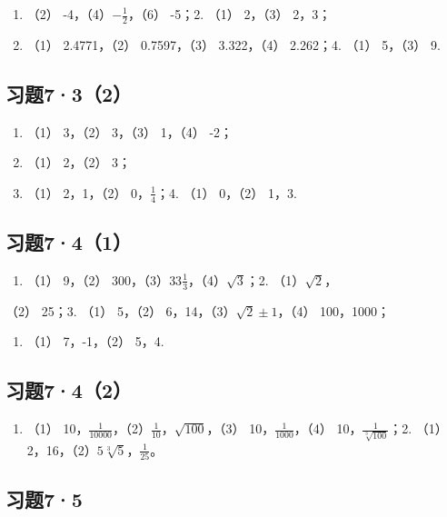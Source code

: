 \begin{enumerate}
\item
  （2） -4，（4）\(-\frac{1}{2}\)，（6） -5；2. （1） 2，（3） 2，3；
\item
  （1） 2.4771，（2） 0.7597，（3） 3.322，（4） 2.262；4. （1）
  5，（3） 9.
\end{enumerate}

\subsection{习题7·3（2）}

\begin{enumerate}
\item
  （1） 3，（2） 3，（3） 1，（4） -2；
\item
  （1） 2，（2） 3；
\item
  （1） 2，1，（2） 0，\(\frac{1}{4}\)；4. （1） 0，（2） 1，3.
\end{enumerate}

\subsection{习题7·4（1）}

\begin{enumerate}
\item
  （1） 9，（2） 300，（3）\(33\frac{1}{3}\)，（4）\(\sqrt{3}\)；2.
  （1）\(\sqrt{2}\)，
\end{enumerate}

（2） 25；3. （1） 5，（2） 6，14，（3）\(\sqrt{2} \pm 1\)，（4）
100，1000；

\begin{enumerate}[start=4]
\item
  （1） 7，-1，（2） 5，4.
\end{enumerate}

\subsection{习题7·4（2）}

\begin{enumerate}
\item
  （1）
  10，\(\frac{1}{10000}\)，（2）\(\frac{1}{10}\)，\(\sqrt{100}\)，（3）
  10，\(\frac{1}{1000}\)，（4） 10，\(\frac{1}{\sqrt[3]{100}}\)；2.
  （1） 2，16，（2）\(5\sqrt[3]{5}\)，\(\frac{1}{25}\)。
\end{enumerate}

\subsection{习题7·5}

